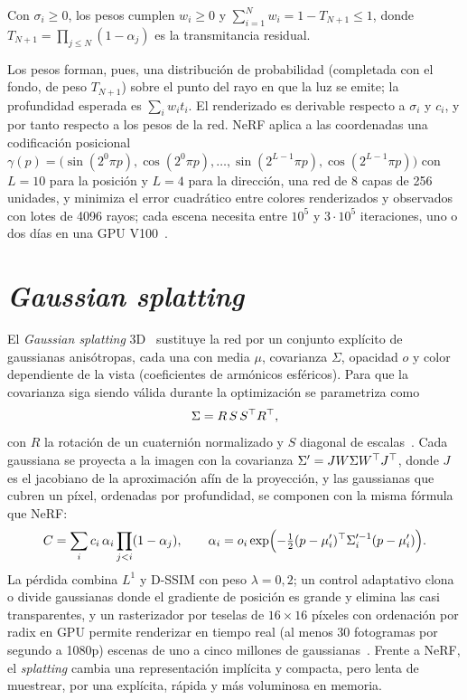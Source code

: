 \begin{proposicion}\label{prop:pesos}
Con $\sigma_i\ge 0$, los pesos cumplen $w_i\ge 0$ y $\sum_{i=1}^Nw_i=1-T_{N+1}\le 1$, donde $T_{N+1}=\prod_{j\le N}(1-\alpha_j)$ es la transmitancia residual.
\end{proposicion}

Los pesos forman, pues, una distribución de probabilidad (completada con el fondo, de peso $T_{N+1}$) sobre el punto del rayo en que la luz se emite; la profundidad esperada es $\sum_iw_it_i$. El renderizado es derivable respecto a $\sigma_i$ y $c_i$, y por tanto respecto a los pesos de la red. NeRF aplica a las coordenadas una codificación posicional $\gamma(p)=\bigl(\sin(2^0\pi p),\cos(2^0\pi p),\dots,\sin(2^{L-1}\pi p),\cos(2^{L-1}\pi p)\bigr)$ con $L=10$ para la posición y $L=4$ para la dirección, una red de 8 capas de 256 unidades, y minimiza el error cuadrático entre colores renderizados y observados con lotes de 4096 rayos; cada escena necesita entre $10^5$ y $3\cdot 10^5$ iteraciones, uno o dos días en una GPU V100~\cite[§5]{nerf}.

\section{\emph{Gaussian splatting}}

El \emph{Gaussian splatting} 3D~\cite{gs} sustituye la red por un conjunto explícito de gaussianas anisótropas, cada una con media $\mu$, covarianza $\Sigma$, opacidad $o$ y color dependiente de la vista (coeficientes de armónicos esféricos). Para que la covarianza siga siendo válida durante la optimización se parametriza como
\[
\Sigma=R\,S\,S^\top R^\top,
\]
con $R$ la rotación de un cuaternión normalizado y $S$ diagonal de escalas~\cite[§4]{gs}. Cada gaussiana se proyecta a la imagen con la covarianza $\Sigma'=JW\Sigma W^\top J^\top$, donde $J$ es el jacobiano de la aproximación afín de la proyección, y las gaussianas que cubren un píxel, ordenadas por profundidad, se componen con la misma fórmula que NeRF:
\[
C=\sum_i c_i\,\alpha_i\prod_{j<i}(1-\alpha_j),\qquad \alpha_i=o_i\exp\Bigl(-\tfrac12(p-\mu_i')^\top\Sigma_i'^{-1}(p-\mu_i')\Bigr).
\]
La pérdida combina $L^1$ y D-SSIM con peso $\lambda=0{,}2$; un control adaptativo clona o divide gaussianas donde el gradiente de posición es grande y elimina las casi transparentes, y un rasterizador por teselas de $16\times 16$ píxeles con ordenación por radix en GPU permite renderizar en tiempo real (al menos 30 fotogramas por segundo a 1080p) escenas de uno a cinco millones de gaussianas~\cite{gs}. Frente a NeRF, el \emph{splatting} cambia una representación implícita y compacta, pero lenta de muestrear, por una explícita, rápida y más voluminosa en memoria.

